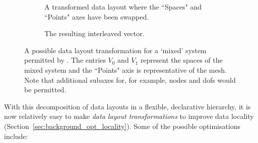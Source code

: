 \begin{figure}
\begin{subfigure}{.65\textwidth}
    \caption{A transformed data layout where the ``Spaces" and ``Points" axes have been swapped.}
    \label{fig:mixedreorder_inner}
  \end{subfigure}
  \begin{subfigure}{.3\textwidth}
    \centering
    \caption{The resulting interleaved vector.}
    \label{fig:mixedreorder_inner_vec}
  \end{subfigure}
  \caption{
    A possible data layout transformation for a `mixed' system permitted by .
    The entries $V_0$ and $V_1$ represent the spaces of the mixed system and the ``Points" axis is representative of the mesh.
    Note that additional subaxes for, for example, nodes and \glspl{dof} would be permitted.
  }
  \label{fig:mixedreorder}
\end{figure}

With this decomposition of data layouts in a flexible, declarative hierarchy, it is now relatively easy to make \textit{data layout transformations} to improve data locality (Section~\ref{sec:background_opt_locality}).
Some of the possible optimisations include:

